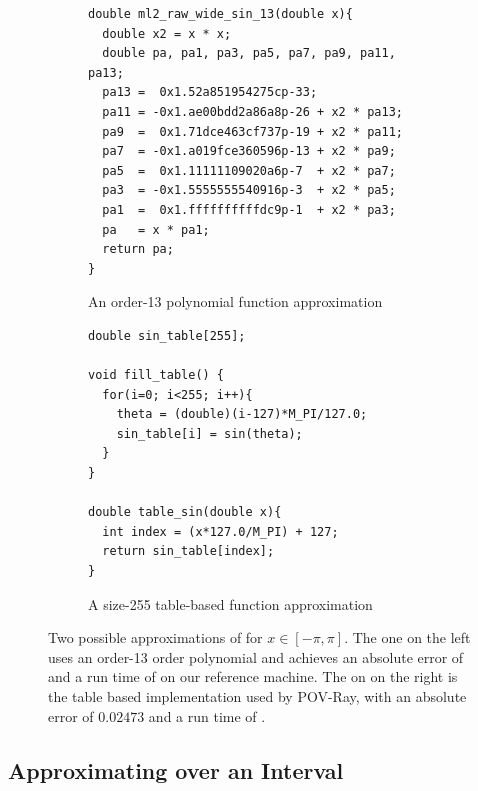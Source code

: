 \documentclass[paper.tex]{subfiles}
\begin{document}
\begin{figure}
\begin{subfigure}{0.48\textwidth}
\scriptsize
\begin{verbatim}
double ml2_raw_wide_sin_13(double x){
  double x2 = x * x;
  double pa, pa1, pa3, pa5, pa7, pa9, pa11, pa13;
  pa13 =  0x1.52a851954275cp-33;
  pa11 = -0x1.ae00bdd2a86a8p-26 + x2 * pa13;
  pa9  =  0x1.71dce463cf737p-19 + x2 * pa11;
  pa7  = -0x1.a019fce360596p-13 + x2 * pa9;
  pa5  =  0x1.11111109020a6p-7  + x2 * pa7;
  pa3  = -0x1.5555555540916p-3  + x2 * pa5;
  pa1  =  0x1.ffffffffffdc9p-1  + x2 * pa3;
  pa   = x * pa1;
  return pa;
}
\end{verbatim}
\caption{An order-13 polynomial function approximation}
\label{fig:poly-based}
\end{subfigure}%
\hfill%
\begin{subfigure}{0.48\textwidth}
\scriptsize
\begin{verbatim}
double sin_table[255];

void fill_table() {
  for(i=0; i<255; i++){
    theta = (double)(i-127)*M_PI/127.0;
    sin_table[i] = sin(theta);
  }
}

double table_sin(double x){
  int index = (x*127.0/M_PI) + 127;
  return sin_table[index];
}
\end{verbatim}
\caption{A size-255 table-based function approximation}
\label{fig:table-based}
\end{subfigure}
\caption{
  Two possible approximations of  for $x \in [-\pi, \pi]$.
  The one on the left uses an order-13 order polynomial
    and achieves an absolute error of \nScarySinError
    and a run time of \nScarySinTime on our reference machine.
  The on on the right
    is the table based implementation used by POV-Ray,
    with an absolute error of $0.02473$
    and a run time of \nPovRayTableImplTime.}
\end{figure}


\subsection{Approximating over an Interval}
\end{document}
